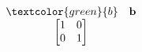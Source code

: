 \documentclass[preview]{standalone}
\begin{document}
\begin{center}
$\begin{array}{c}\begin{matrix}\textcolor{green}{b} & \mathbf{b} \end{matrix} \\\begin{bmatrix} 1 & 0 \\0 & 1 \end{bmatrix} \end{array}$
\end{center}
\end{document}
